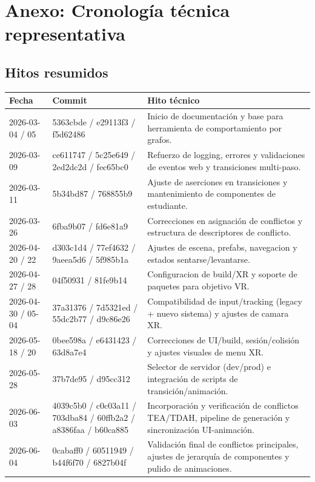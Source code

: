 \section{Anexo: Cronología técnica representativa}

\subsection{Hitos resumidos}
\begin{longtable}{p{} p{} p{}}
\toprule
\textbf{Fecha} & \textbf{Commit} & \textbf{Hito técnico} \\
\midrule
2026-03-04 / 05     & 5363cbde / e29113f3 / f5d62486                                    & Inicio de documentación y base para herramienta de comportamiento por grafos. \\
2026-03-09          & ce611747 / 5c25e649 / 2ed2dc2d / fec65bc0                         & Refuerzo de logging, errores y validaciones de eventos web y transiciones multi-paso. \\
2026-03-11          & 5b34bd87 / 768855b9                                               & Ajuste de aserciones en transiciones y mantenimiento de componentes de estudiante. \\
2026-03-26          & 6fba9b07 / fd6e81a9                                               & Correcciones en asignación de conflictos y estructura de descriptores de conflicto. \\
2026-04-20 / 22     & d303c1d4 / 77ef4632 / 9aeea5d6 / 5f985b1a                         & Ajustes de escena, prefabs, navegacion y estados sentarse/levantarse. \\
2026-04-27 / 28     & 04f50931 / 81fe9b14                                               & Configuracion de build/XR y soporte de paquetes para objetivo VR. \\
2026-04-30 / 05-04  & 37a31376 / 7d5321ed / 55dc2b77 / d9c86e26                         & Compatibilidad de input/tracking (legacy + nuevo sistema) y ajustes de camara XR. \\
2026-05-18 / 20     & 0bee598a / e6431423 / 63d8a7e4                                    & Correcciones de UI/build, sesión/colisión y ajustes visuales de menu XR. \\
2026-05-28          & 37b7de95 / d95cc312                                               & Selector de servidor (dev/prod) e integración de scripts de transición/animación. \\
2026-06-03          & 4039c5b0 / c0c03a11 / 703dba84 / 60ffb2a2 / a8386faa / b60ca885   & Incorporación y verificación de conflictos TEA/TDAH, pipeline de generación y sincronización UI-animación. \\
2026-06-04          & 0cabaff0 / 60511949 / b44f6f70 / 6827b04f                         & Validación final de conflictos principales, ajustes de jerarquía de componentes y pulido de animaciones. \\
\bottomrule
\end{longtable}

